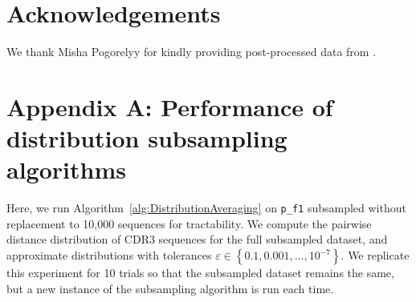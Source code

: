\documentclass{article}
\newcommand{\beginsupplement}{%
        \setcounter{table}{0}
        \renewcommand{\thetable}{S\arabic{table}}%
        \setcounter{figure}{0}
        \renewcommand{\thefigure}{S\arabic{figure}}%
     }
\begin{document}
\section*{Acknowledgements}
We thank Misha Pogorelyy for kindly providing post-processed data from \cite{Pogorelyy2018-ak}.





\beginsupplement

\section*{Appendix A: Performance of distribution subsampling algorithms}
Here, we run Algorithm~\ref{alg:DistributionAveraging} on \texttt{p\_f1} subsampled without replacement to 10,000 sequences for tractability.
We compute the pairwise distance distribution of CDR3 sequences for the full subsampled dataset, and approximate distributions with tolerances $\varepsilon \in \left\{0.1, 0.001, \dotsc, 10^{-7} \right\}$.
We replicate this experiment for 10 trials so that the subsampled dataset remains the same, but a new instance of the subsampling algorithm is run each time.
\end{document}
